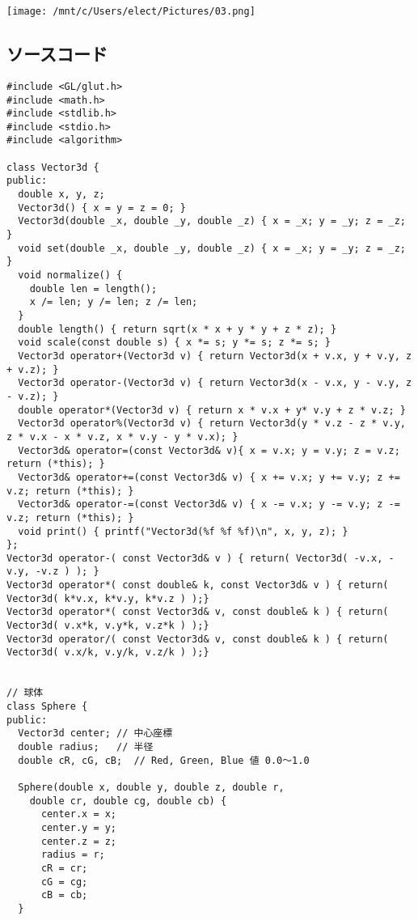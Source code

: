 \documentclass{scrartcl}
\begin{document}
\begin{center}
\texttt{[image: /mnt/c/Users/elect/Pictures/03.png]}
\end{center}

\subsection{ソースコード}
\label{sec:org240b49a}
\begin{verbatim}
#include <GL/glut.h>
#include <math.h>
#include <stdlib.h>
#include <stdio.h>
#include <algorithm>

class Vector3d {
public:
  double x, y, z;
  Vector3d() { x = y = z = 0; }
  Vector3d(double _x, double _y, double _z) { x = _x; y = _y; z = _z; }
  void set(double _x, double _y, double _z) { x = _x; y = _y; z = _z; }
  void normalize() {
    double len = length();
    x /= len; y /= len; z /= len;
  }
  double length() { return sqrt(x * x + y * y + z * z); }
  void scale(const double s) { x *= s; y *= s; z *= s; }
  Vector3d operator+(Vector3d v) { return Vector3d(x + v.x, y + v.y, z + v.z); }
  Vector3d operator-(Vector3d v) { return Vector3d(x - v.x, y - v.y, z - v.z); }
  double operator*(Vector3d v) { return x * v.x + y* v.y + z * v.z; }
  Vector3d operator%(Vector3d v) { return Vector3d(y * v.z - z * v.y, z * v.x - x * v.z, x * v.y - y * v.x); }
  Vector3d& operator=(const Vector3d& v){ x = v.x; y = v.y; z = v.z; return (*this); }
  Vector3d& operator+=(const Vector3d& v) { x += v.x; y += v.y; z += v.z; return (*this); }
  Vector3d& operator-=(const Vector3d& v) { x -= v.x; y -= v.y; z -= v.z; return (*this); }
  void print() { printf("Vector3d(%f %f %f)\n", x, y, z); }
};
Vector3d operator-( const Vector3d& v ) { return( Vector3d( -v.x, -v.y, -v.z ) ); }
Vector3d operator*( const double& k, const Vector3d& v ) { return( Vector3d( k*v.x, k*v.y, k*v.z ) );}
Vector3d operator*( const Vector3d& v, const double& k ) { return( Vector3d( v.x*k, v.y*k, v.z*k ) );}
Vector3d operator/( const Vector3d& v, const double& k ) { return( Vector3d( v.x/k, v.y/k, v.z/k ) );}


// 球体
class Sphere {
public:
  Vector3d center; // 中心座標
  double radius;   // 半径
  double cR, cG, cB;  // Red, Green, Blue 値 0.0〜1.0

  Sphere(double x, double y, double z, double r,
    double cr, double cg, double cb) {
      center.x = x;
      center.y = y;
      center.z = z;
      radius = r;
      cR = cr;
      cG = cg;
      cB = cb;
  }


\end{verbatim}
\end{document}
